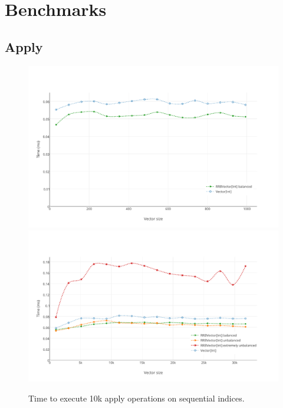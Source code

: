 \section{Benchmarks}

\subsection{Apply}

\begin{figure}[h!]
  \centering
  \includegraphics[width=\textwidth]{Benchmarks/Apply_2.pdf}
  \includegraphics[width=\textwidth]{Benchmarks/Apply_3.pdf}
  \label{ApplyBenchmarks}
  \caption{Time to execute 10k apply operations on sequential indices.}
\end{figure}


